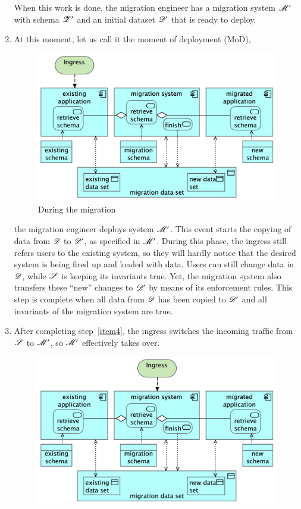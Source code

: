 \documentclass{elsarticle}
\begin{document}
\begin{enumerate}
      When this work is done, the migration engineer has a migration system $\mathscr{M}'$ with schema $\mathscr{Z}'$ and an initial dataset $\mathscr{D}'$
      that is ready to deploy.
\item\label{item4}
      At this moment, let us call it the moment of deployment (MoD),
\begin{figure}[h]
   \centering
   \includegraphics[scale=0.09]{figures/4MoD.png}
   \caption{During the migration}
   \label{fig:4MoD}
\end{figure}
      the migration engineer deploys system $\mathscr{M}'$.
      This event starts the copying of data from $\mathscr{D}$ to $\mathscr{D}'$, as specified in $\mathscr{M}'$.
      During this phase, the ingress still refers users to the existing system,
      so they will hardly notice that the desired system is being fired up and loaded with data.
      Users can still change data in $\mathscr{D}$, while $\mathscr{S}$ is keeping its invariants true.
      Yet, the migration system also transfers these ``new'' changes to $\mathscr{D}'$ by means of its enforcement rules.
      This step is complete when all data from $\mathscr{D}$ has been copied to $\mathscr{D}'$ and all invariants of the migration system are true.
\item After completing step~\ref{item4}, the ingress switches the incoming traffic from $\mathscr{S}$ to $\mathscr{M}'$,
      so $\mathscr{M}'$ effectively takes over.
\begin{figure}[h]
   \centering
   \includegraphics[scale=0.09]{figures/5MoT.png}

\end{figure}
\end{enumerate}
\end{document}

